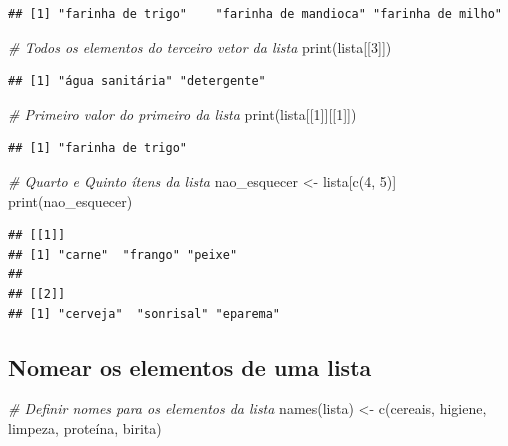 \documentclass[
]{article}
\newenvironment{Shaded}{\begin{snugshade}}{\end{snugshade}}
\newcommand{\CommentTok}[1]{\textcolor[rgb]{0.56,0.35,0.01}{\textit{#1}}}
\newcommand{\DecValTok}[1]{\textcolor[rgb]{0.00,0.00,0.81}{#1}}
\newcommand{\FunctionTok}[1]{\textcolor[rgb]{0.00,0.00,0.00}{#1}}
\newcommand{\NormalTok}[1]{#1}
\newcommand{\OtherTok}[1]{\textcolor[rgb]{0.56,0.35,0.01}{#1}}
\newcommand{\StringTok}[1]{\textcolor[rgb]{0.31,0.60,0.02}{#1}}
\begin{document}
\begin{verbatim}
## [1] "farinha de trigo"    "farinha de mandioca" "farinha de milho"
\end{verbatim}

\begin{Shaded}
\begin{Highlighting}[]
\CommentTok{\# Todos os elementos do terceiro vetor da lista}
\FunctionTok{print}\NormalTok{(lista[[}\DecValTok{3}\NormalTok{]])}
\end{Highlighting}
\end{Shaded}

\begin{verbatim}
## [1] "água sanitária" "detergente"
\end{verbatim}

\begin{Shaded}
\begin{Highlighting}[]
\CommentTok{\# Primeiro valor do primeiro da lista}
\FunctionTok{print}\NormalTok{(lista[[}\DecValTok{1}\NormalTok{]][[}\DecValTok{1}\NormalTok{]])}
\end{Highlighting}
\end{Shaded}

\begin{verbatim}
## [1] "farinha de trigo"
\end{verbatim}

\begin{Shaded}
\begin{Highlighting}[]
\CommentTok{\# Quarto e Quinto ítens da lista}
\NormalTok{nao\_esquecer }\OtherTok{\textless{}{-}}\NormalTok{ lista[}\FunctionTok{c}\NormalTok{(}\DecValTok{4}\NormalTok{, }\DecValTok{5}\NormalTok{)]}
\FunctionTok{print}\NormalTok{(nao\_esquecer)}
\end{Highlighting}
\end{Shaded}

\begin{verbatim}
## [[1]]
## [1] "carne"  "frango" "peixe" 
## 
## [[2]]
## [1] "cerveja"  "sonrisal" "eparema"
\end{verbatim}

\hypertarget{nomear-os-elementos-de-uma-lista}{%
\subsection{Nomear os elementos de uma
lista}\label{nomear-os-elementos-de-uma-lista}}

\begin{Shaded}
\begin{Highlighting}[]
\CommentTok{\# Definir nomes para os elementos da lista}
\FunctionTok{names}\NormalTok{(lista) }\OtherTok{\textless{}{-}} \FunctionTok{c}\NormalTok{(}\StringTok{\textquotesingle{}cereais\textquotesingle{}}\NormalTok{, }\StringTok{\textquotesingle{}higiene\textquotesingle{}}\NormalTok{, }\StringTok{\textquotesingle{}limpeza\textquotesingle{}}\NormalTok{,}
                  \StringTok{\textquotesingle{}proteína\textquotesingle{}}\NormalTok{, }\StringTok{\textquotesingle{}birita\textquotesingle{}}\NormalTok{)}
\end{Highlighting}
\end{Shaded}
\end{document}
